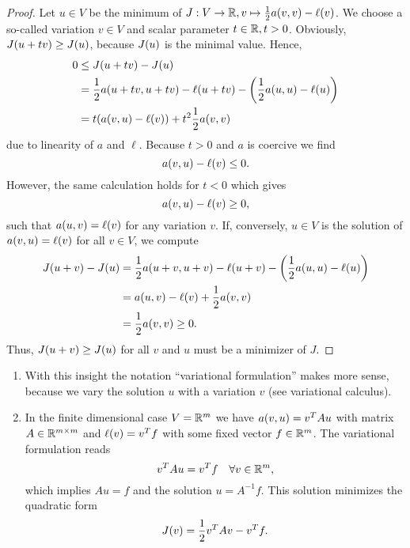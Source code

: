 \begin{proof}
    Let \(u \in V\) be the minimum of \(J: V \to \R, v \mapsto \frac{1}{2}a\parentheses*{v, v} - \ell\parentheses*{v}\).
    We choose a so-called variation \(v \in V\) and scalar parameter \(t \in \mathbb{R}, t > 0\).
    Obviously, \(J\parentheses*{u + tv} \ge J\parentheses*{u}\), because \(J\parentheses*{u}\) is the minimal value.
    Hence,
    \begin{align*}
        0 &\le J\parentheses*{u + tv} - J\parentheses*{u}\\
        &= \frac{1}{2}a\parentheses*{u + tv, u + tv} - \ell\parentheses*{u + tv} - \parentheses*{\frac{1}{2}a\parentheses*{u, u} - \ell\parentheses*{u}}\\
        &= t\parentheses*{a\parentheses*{v, u} - \ell\parentheses*{v}} + t^2 \frac{1}{2}a\parentheses*{v, v}
    \end{align*}
    due to linearity of \(a\) and \(\ell\).
    Because \(t > 0\) and \(a\) is coercive we find
    \[
        a\parentheses*{v, u} - \ell\parentheses*{v} \le 0.
    \]
    However, the same calculation holds for \(t < 0\) which gives
    \[
        a\parentheses*{v, u} - \ell\parentheses*{v} \ge 0,
    \]
    such that \(a\parentheses*{u, v} = \ell\parentheses*{v}\) for any variation \(v\).
    If, conversely, \(u \in V\) is the solution of \(a\parentheses*{v, u} = \ell\parentheses*{v}\) for all \(v \in V\), we compute
    \begin{align*}
        J\parentheses*{u + v} - J\parentheses*{u} &= \frac{1}{2}a\parentheses*{u + v, u + v} - \ell\parentheses*{u + v} - \parentheses*{\frac{1}{2}a\parentheses*{u, u} - \ell\parentheses*{u}}\\
        &= a\parentheses*{u, v} - \ell\parentheses*{v} + \frac{1}{2}a\parentheses*{v, v}\\
        &= \frac{1}{2}a\parentheses*{v, v} \ge 0.
    \end{align*}
    Thus, \(J\parentheses*{u + v} \ge J\parentheses*{u}\) for all \(v\) and \(u\) must be a minimizer of \(J\).
\end{proof}

\begin{remark}
    \begin{enumerate}
        \item With this insight the notation ``variational formulation'' makes more sense, because we vary the solution \(u\) with a variation \(v\) (see variational calculus).
        \item In the finite dimensional case \(V = \mathbb{R}^m\) we have \(a\parentheses*{v, u} = v^T Au\) with matrix \(A \in \mathbb{R}^{m \times m}\) and \(\ell\parentheses*{v} = v^T f\) with some fixed vector \(f \in \mathbb{R}^m\).
        The variational formulation reads
        \[
            v^T Au = v^T f \quad \forall v \in \mathbb{R}^m,
        \]
        which implies \(Au = f\) and the solution \(u = A^{-1}f\).
        This solution minimizes the quadratic form
        \[
            J\parentheses*{v} = \frac{1}{2}v^T Av - v^T f.
        \]
    \end{enumerate}
\end{remark}
